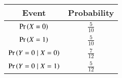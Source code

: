 
\begin{center}
\begin{tabular}{|c|c|}
\hline
\textbf{Event}& \textbf{Probability} \\ \hline
$\Pr\left(X = 0\right)$ & 	$\frac{5}{10}$ \\ \hline
$\Pr\left(X = 1\right)$ & 	$\frac{5}{10}$ \\ \hline
$\Pr\left(Y = 0 \mid X = 0\right)$ &  $\frac{7}{12}$ \\ \hline
$\Pr\left(Y = 0 \mid X = 1\right)$ &  $\frac{5}{12}$ \\ \hline
\end{tabular}
\end{center}
